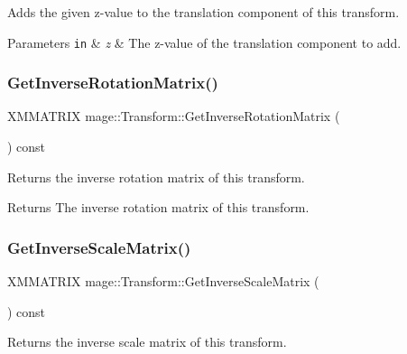 Adds the given z-\/value to the translation component of this transform.


\begin{DoxyParams}[1]{Parameters}
\mbox{\tt in}  & {\em z} & The z-\/value of the translation component to add. \\
\hline
\end{DoxyParams}
\hypertarget{structmage_1_1_transform_a12e7ee212a9270fb3f01de9b7f5ee3b8}{}\label{structmage_1_1_transform_a12e7ee212a9270fb3f01de9b7f5ee3b8} 
\subsubsection{\texorpdfstring{Get\+Inverse\+Rotation\+Matrix()}{GetInverseRotationMatrix()}}
{\footnotesize\ttfamily X\+M\+M\+A\+T\+R\+IX mage\+::\+Transform\+::\+Get\+Inverse\+Rotation\+Matrix (\begin{DoxyParamCaption}{ }\end{DoxyParamCaption}) const\hspace{0.3cm}{\ttfamily [private]}}

Returns the inverse rotation matrix of this transform.

\begin{DoxyReturn}{Returns}
The inverse rotation matrix of this transform. 
\end{DoxyReturn}
\hypertarget{structmage_1_1_transform_a31da6a53e73a6254bc36cd0348c65cda}{}\label{structmage_1_1_transform_a31da6a53e73a6254bc36cd0348c65cda} 
\subsubsection{\texorpdfstring{Get\+Inverse\+Scale\+Matrix()}{GetInverseScaleMatrix()}}
{\footnotesize\ttfamily X\+M\+M\+A\+T\+R\+IX mage\+::\+Transform\+::\+Get\+Inverse\+Scale\+Matrix (\begin{DoxyParamCaption}{ }\end{DoxyParamCaption}) const\hspace{0.3cm}{\ttfamily [private]}}

Returns the inverse scale matrix of this transform.

